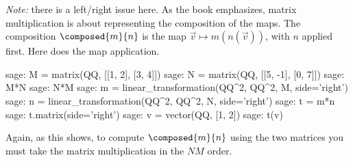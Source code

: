 \textit{Note:} there is a left/right issue here.
As the book emphasizes, matrix multiplication is about 
representing the composition of the maps.
The composition $\composed{m}{n}$ is the map $\vec{v}\mapsto m(n(\vec{v}))$, 
with $n$ applied first. 
Here \Sage{} does the map application.
\begin{sagecommandline}
sage: M = matrix(QQ, [[1, 2], [3, 4]])
sage: N = matrix(QQ, [[5, -1], [0, 7]])
sage: M*N
sage: N*M
sage: m = linear_transformation(QQ^2, QQ^2, M, side='right')
sage: n = linear_transformation(QQ^2, QQ^2, N, side='right')
sage: t = m*n
sage: t.matrix(side='right')
sage: v = vector(QQ, [1, 2])
sage: t(v)
\end{sagecommandline}
Again, as this shows,
to compute $\composed{m}{n}$ using the two matrices
you must take the matrix multiplication in the $NM$ order. 




\endinput


TODO:
